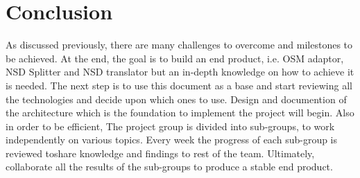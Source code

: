 \chapter{Conclusion}
\label{ch:Conclusion}
As discussed previously, there are many challenges to overcome and milestones to be achieved.
At the end, the goal is to build an end product, i.e. OSM adaptor, NSD Splitter and NSD translator but 
an in-depth knowledge on how to achieve it is needed. The next step is to use this document as a base and start reviewing all the technologies and decide upon which ones to use. Design and documention of the architecture which is the foundation to implement the project will begin.
Also in order to be efficient, The project group is divided into sub-groups, to work independently on various topics. Every week the progress of each sub-group is reviewed toshare knowledge and findings to rest of the team. Ultimately, collaborate all the results of the sub-groups to produce a stable end product. 
